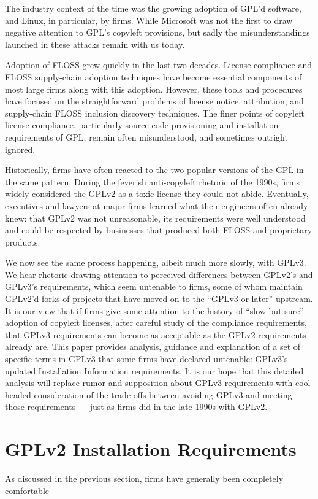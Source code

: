 The industry context of the time was the growing adoption of GPL'd software,
and Linux, in particular, by firms.  While Microsoft was not the first to
draw negative attention to GPL's copyleft provisions, but sadly the
misunderstandings launched in these attacks remain with us today.

Adoption of FLOSS grew quickly in the last two decades.  License compliance
and FLOSS supply-chain adoption techniques have become essential components
of most large firms along with this adoption.  However, these tools and
procedures have focused on the straightforward problems of license notice,
attribution, and supply-chain FLOSS inclusion discovery techniques.  The
finer points of copyleft license compliance, particularly source code
provisioning and installation requirements of GPL, remain often
misunderstood, and sometimes outright ignored.

Historically, firms have often reacted to the two popular versions of the GPL
in the same pattern.  During the feverish anti-copyleft rhetoric of the
1990s, firms widely considered the GPLv2 as a toxic license they could not
abide.  Eventually, executives and lawyers at major firms learned what their
engineers often already knew: that GPLv2 was not unreasonable, its
requirements were well understood and could be respected by businesses that
produced both FLOSS and proprietary products.

We now see the same process happening, albeit much more slowly, with GPLv3.
We hear rhetoric drawing attention to perceived differences between GPLv2's
and GPLv3's requirements, which seem untenable to firms, some of whom
maintain GPLv2'd forks of projects that have moved on to the
``GPLv3-or-later'' upstream.  It is our view that if firms give some
attention to the history of ``slow but sure'' adoption of copyleft licenses,
after careful study of the compliance requirements, that GPLv3 requirements
can become as acceptable as the GPLv2 requirements already are.  This paper
provides analysis, guidance and explanation of a set of specific terms in
GPLv3 that some firms have declared untenable: GPLv3's updated Installation
Information requirements.  It is our hope that this detailed analysis will
replace rumor and supposition about GPLv3 requirements with cool-headed
consideration of the trade-offs between avoiding GPLv3 and meeting those
requirements --- just as firms did in the late 1990s with GPLv2.

\section{GPLv2 Installation Requirements}

As discussed in the previous section, firms have generally been completely
comfortable 


